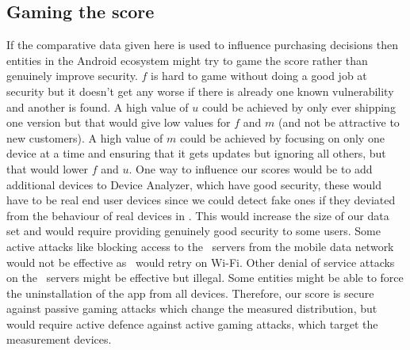 \subsection{Gaming the score}\label{sec:gaming}
If the comparative data given here is used to influence purchasing decisions then entities in the Android ecosystem might try to game the score rather than genuinely improve security.
$f$ is hard to game without doing a good job at security but it doesn't get any worse if there is already one known vulnerability and another is found.
A high value of $u$ could be achieved by only ever shipping one version but that would give low values for $f$ and $m$ (and not be attractive to new customers).
A high value of $m$ could be achieved by focusing on only one device at a time and ensuring that it gets updates but ignoring all others, but that would lower $f$ and $u$.
One way to influence our scores would be to add additional devices to Device Analyzer, which have good security, these would have to be real end user devices since we could detect fake ones if they deviated from the behaviour of real devices in \da.
This would increase the size of our data set and would require providing genuinely good security to some users.
Some active attacks like blocking access to the \da\ servers from the mobile data network would not be effective as \da\ would retry on Wi-Fi.
Other denial of service attacks on the \da\ servers might be effective but illegal.
Some entities might be able to force the uninstallation of the app from all devices.
Therefore, our score is secure against passive gaming attacks which change the measured distribution, but would require active defence against active gaming attacks, which target the measurement devices.

